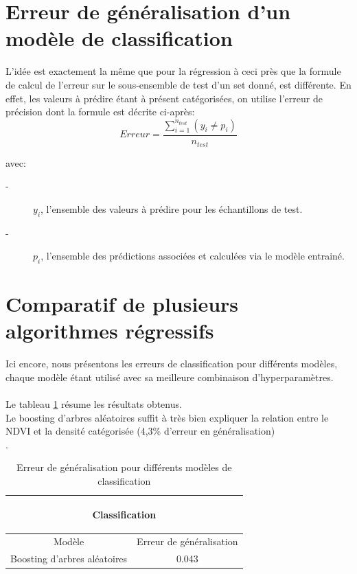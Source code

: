\documentclass{book}
\begin{document}
\clearpage
 
\section{Erreur de généralisation d'un modèle de classification}

L'idée est exactement la même que pour la régression à ceci près que la formule de calcul de l'erreur sur le sous-ensemble de test d'un set donné, est
différente. En effet, les valeurs à prédire étant à présent catégorisées, on utilise l'erreur de précision dont la formule est décrite ci-après:\\

\begin{equation}
Erreur = \frac{\sum \limits_{\underset{}{i=1}}^{n_{test}} (y_i \neq p_i)}{n_{test}}
\end{equation}

avec:
\begin{description}
\item[-] ${y_i}$, l'ensemble des valeurs à prédire pour les échantillons de test.
\item[-] ${p_i}$, l'ensemble des prédictions associées et calculées via le modèle entrainé.
\end{description}

\section{Comparatif de plusieurs algorithmes régressifs}

Ici encore, nous présentons les erreurs de classification pour différents modèles, chaque modèle étant utilisé avec sa meilleure combinaison
d'hyperparamètres.\\
\\
Le tableau \ref{classification_resultats} résume les résultats obtenus.\\
Le boosting d'arbres aléatoires suffit à très bien expliquer la relation entre le NDVI et la densité catégorisée (4,3\% d'erreur en généralisation)\\.
\begin{table}[H]
\begin{center}
\begin{adjustbox}{max width=\textwidth}
\begin{tabular}{|c|c|}
\hline
\multicolumn{2}{|c|}{\begin{bf}Classification\end{bf}} \\
\hline 
Modèle & Erreur de généralisation \\
\hline
Boosting d'arbres aléatoires & 0.043\\
\hline
\end{tabular}
\end{adjustbox}
\end{center}
\caption{Erreur de généralisation pour différents modèles de classification}
\label{classification_resultats}
\end{table}
\clearpage
\backmatter

\listoftables

\listoffigures



\end{document}
